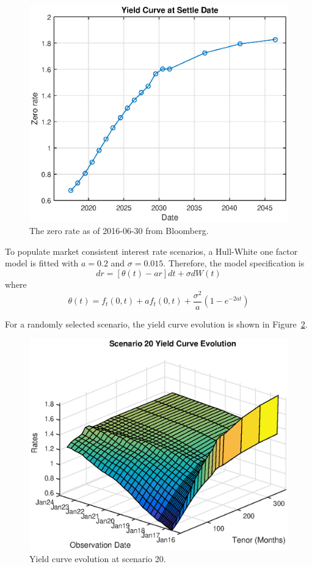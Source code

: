 \begin{center}
  \begin{figure}
  \centering
      \includegraphics[scale=0.6]{cva_zero_rate.eps}
      \caption{The zero rate as of 2016-06-30 from Bloomberg.}\label{fig::cva_zero_rate}
  \end{figure}
\end{center} 

To populate market consistent interest rate scenarios, a Hull-White one factor model is fitted with $a=0.2$ and $\sigma=0.015$. Therefore, the model specification is 
$$
dr = [\theta(t)-ar] dt +\sigma dW(t)
$$
where
$$
\theta(t) = f_t(0,t) + a f_t(0,t) + \frac{\sigma^2}{a}(1-e^{-2at}) 
$$

For a randomly selected scenario, the yield curve evolution is shown in Figure~\ref{fig::cva_yield_curve}. 

\begin{center}
  \begin{figure}
  \centering
      \includegraphics[scale=0.6]{cva_yield_curve.eps}
      \caption{Yield curve evolution at scenario 20.}\label{fig::cva_yield_curve}
  \end{figure}
\end{center} 

